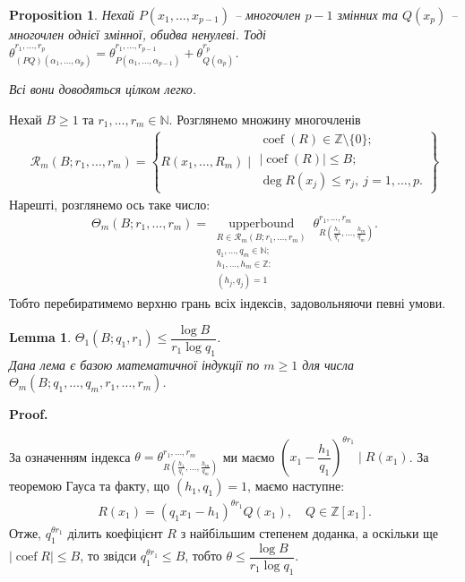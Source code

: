\documentclass[a4paper, 10pt]{article}
\makeatletter
\theoremstyle{theoremdd}
\theoremstyle{theoremdd}
\theoremstyle{theoremdd}
\theoremstyle{theoremdd}
\theoremstyle{theoremdd}
\theoremstyle{theoremdd}
\theoremstyle{theoremdd}
\theoremstyle{theoremdd}
\theoremstyle{theoremdd}
\newtheorem{proposition}[theorem]{Proposition}
\theoremstyle{theoremdd}
\theoremstyle{theoremdd}
\theoremstyle{theoremdd}
\theoremstyle{theoremdd}
\newtheorem{lemma}[theorem]{Lemma}
\theoremstyle{theoremdd}
\theoremstyle{theoremdd}
\renewenvironment{proof}[1][Proof.\\]{\par
\pushQED{\hfill \qed}%
\normalfont \topsep6\p@\@plus6\p@\relax
\trivlist
\item\relax
{\bfseries
#1\@addpunct{.}}\hspace\labelsep\ignorespaces
}{%
\popQED\endtrivlist\@endpefalse
}
\DeclareMathOperator{\coef}{coef}
\DeclareMathOperator{\upperbound}{upper bound}
\makeatother
\begin{document}
\begin{proposition}
Нехай $P(x_1,\dots,x_{p-1})$ -- многочлен $p-1$ змінних та $Q(x_p)$ -- многочлен однієї змінної, обидва ненулеві. Тоді\\
$\theta_{(PQ)(\alpha_1,\dots,\alpha_p)}^{r_1,\dots,r_p} = \theta_{P(\alpha_1,\dots,\alpha_{p-1})}^{r_1,\dots,r_{p-1}} + \theta_{Q(\alpha_p)}^{r_p}$.
\end{proposition}

\textit{Всі вони доводяться цілком легко.}

Нехай $B \geq 1$ та $r_1,\dots,r_m \in \mathbb{N}$. Розглянемо множину многочленів
\begin{align*}
\mathcal{R}_m(B;r_1,\dots,r_m) = \left\{ R(x_1,\dots,R_m) \mid \substack{\coef(R) \in \mathbb{Z} \setminus \{0\}; \\ |\coef(R)| \leq B; \\ \deg R(x_j) \leq r_j,\ j = 1,\dots,p. } \right\}
\end{align*}
Нарешті, розглянемо ось таке число:
\begin{align*}
\Theta_m(B;r_1,\dots,r_m) = \underset{{\substack{R \in \mathcal{R}_m(B;r_1,\dots,r_m) \\ q_1,\dots,q_m \in \mathbb{N}; \\ h_1,\dots,h_m \in \mathbb{Z}: \\
(h_j,q_j) = 1 }} }{\upperbound}\theta_{R\left( \frac{h_1}{q_1},\dots,\frac{h_m}{q_m} \right)}^{r_1,\dots,r_m}.
\end{align*}
Тобто перебиратимемо верхню грань всіх індексів, задовольняючи певні умови.

\begin{lemma}
$\Theta_1(B;q_1,r_1) \leq \dfrac{\log B}{r_1 \log q_1}$.\\
\textit{Дана лема є базою математичної індукції по $m \geq 1$ для числа $\Theta_m(B;q_1,\dots,q_m,r_1,\dots,r_m)$.}
\end{lemma}

\begin{proof}
За означенням індекса $\theta = \theta_{R\left( \frac{h_1}{q_1},\dots, \frac{h_m}{q_m}  \right)}^{r_1,\dots,r_m}$ ми маємо $\left( x_1 - \dfrac{h_1}{q_1} \right)^{\theta r_1} \mid R(x_1)$. За теоремою Гауса та факту, що $(h_1,q_1) = 1$, маємо наступне:
\begin{align*}
R(x_1) = (q_1x_1-h_1)^{\theta r_1} Q(x_1),\quad Q \in \mathbb{Z}[x_1].
\end{align*}
Отже, $q_1^{\theta r_1}$ ділить коефіцієнт $R$ з найбільшим степенем доданка, а оскільки ще $|\coef R| \leq B$, то звідси $q_1^{\theta r_1} \leq B$, тобто $\theta \leq \dfrac{\log B}{r_1 \log q_1}$.
\end{proof}
\end{document}
